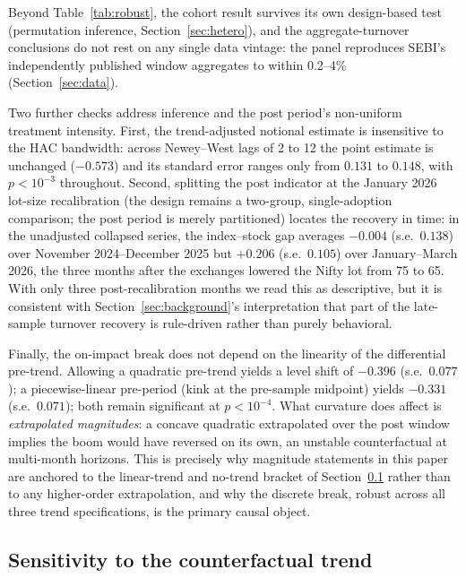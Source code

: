 \documentclass[12pt]{article}
\begin{document}
Beyond Table~\ref{tab:robust}, the cohort result survives its own design-based
test (permutation inference, Section~\ref{sec:hetero}), and the
aggregate-turnover conclusions do not rest on any single data vintage: the
panel reproduces SEBI's independently published window aggregates to within
0.2--4\% (Section~\ref{sec:data}).

Two further checks address inference and the post period's non-uniform
treatment intensity. First, the trend-adjusted notional estimate is
insensitive to the HAC bandwidth: across Newey--West lags of 2 to 12 the
point estimate is unchanged ($-0.573$) and its standard error ranges only
from $0.131$ to $0.148$, with $p<10^{-3}$ throughout. Second, splitting the
post indicator at the January 2026 lot-size recalibration (the design
remains a two-group, single-adoption comparison; the post period is merely
partitioned) locates the recovery in time: in the unadjusted collapsed
series, the index--stock gap averages $-0.004$ (s.e.\ $0.138$) over
November 2024--December 2025 but $+0.206$ (s.e.\ $0.105$) over
January--March 2026, the three months after the exchanges lowered the
Nifty lot from 75 to 65. With only three post-recalibration months we read
this as descriptive, but it is consistent with
Section~\ref{sec:background}'s interpretation that part of the late-sample
turnover recovery is rule-driven rather than purely behavioral.

Finally, the on-impact break does not depend on the linearity of the
differential pre-trend. Allowing a quadratic pre-trend yields a level shift
of $-0.396$ (s.e.\ $0.077$); a piecewise-linear pre-period (kink at the
pre-sample midpoint) yields $-0.331$ (s.e.\ $0.071$); both remain
significant at $p<10^{-4}$. What curvature does affect is
\emph{extrapolated magnitudes}: a concave quadratic extrapolated over the
post window implies the boom would have reversed on its own, an unstable
counterfactual at multi-month horizons. This is precisely why magnitude
statements in this paper are anchored to the linear-trend and no-trend
bracket of Section~\ref{subsec:sens} rather than to any higher-order
extrapolation, and why the discrete break, robust across all three trend
specifications, is the primary causal object.

\subsection{Sensitivity to the counterfactual trend}\label{subsec:sens}
\end{document}
